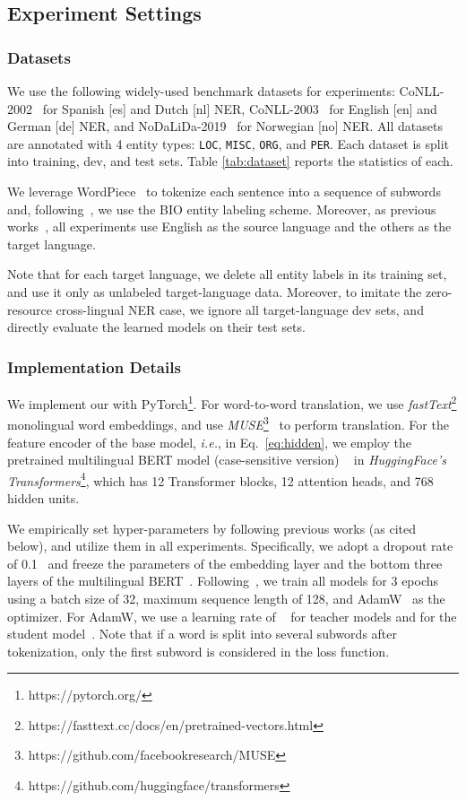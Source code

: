 \documentclass{article}
\newcommand\ie{\textit{i.e.}}
\newcommand\unitrans{\text{UniTrans}}
\begin{document}
\subsection{Experiment Settings}
\subsubsection{Datasets}
We use the following widely-used benchmark datasets for experiments:
CoNLL-2002~\cite{tjong2002introduction} for Spanish [es] and Dutch [nl] NER, CoNLL-2003~\cite{tjong2003introduction} for English [en] and German [de] NER, and NoDaLiDa-2019~\cite{johansen2019ner} for Norwegian [no] NER. 
All datasets are annotated with 4 entity types: \texttt{LOC}, \texttt{MISC}, \texttt{ORG}, and \texttt{PER}. 
Each dataset is split into training, dev, and test sets.
Table \ref{tab:dataset} reports the statistics of each.

We leverage WordPiece~\cite{wu2016google} to tokenize each sentence into a sequence of subwords and, following~\cite{wu2019beto,wu2020enhanced}, we use the BIO entity labeling scheme.
Moreover, as previous works~\cite{wu2020enhanced}, all experiments use English as the source language and the others as the target language. 

Note that for each target language, we delete all entity labels in its training set, and use it only as unlabeled target-language data. Moreover, to imitate the zero-resource cross-lingual NER case, we ignore all target-language dev sets, and directly evaluate the learned models on their test sets.


\subsubsection{Implementation Details}
We implement our \unitrans{} with PyTorch\footnote{https://pytorch.org/}.
For word-to-word translation, we use \emph{fastText}\footnote{https://fasttext.cc/docs/en/pretrained-vectors.html} monolingual word embeddings, and use \emph{MUSE}\footnote{https://github.com/facebookresearch/MUSE}~\cite{lample2018word} to perform translation. 
For the feature encoder of the base model, \ie{},  in Eq.~\ref{eq:hidden}, we employ the pretrained multilingual BERT model (case-sensitive version)  ~\cite{devlin2019bert} in \emph{HuggingFace's Transformers}\footnote{https://github.com/huggingface/transformers}, which has 12 Transformer blocks, 12 attention heads, and 768 hidden units. 

We empirically set \unitrans{} hyper-parameters by following previous works (as cited below), and utilize them in all experiments. 
Specifically, we adopt a dropout rate of 0.1~\cite{wu2020enhanced} and freeze the parameters of the embedding layer and the bottom three layers of the multilingual BERT~\cite{wu2019beto}.
Following~\cite{wu2020enhanced}, we train all models for 3 epochs using a batch size of 32, maximum sequence length of 128, and AdamW~\cite{loshchilov2017fixing} as the optimizer. For AdamW, we use a learning rate of  ~\cite{wolf2019transformers} for teacher models and  for the student model~\cite{yang2019model}.
Note that if a word is split into several subwords after tokenization, only the first subword is considered in the loss function.
\end{document}

